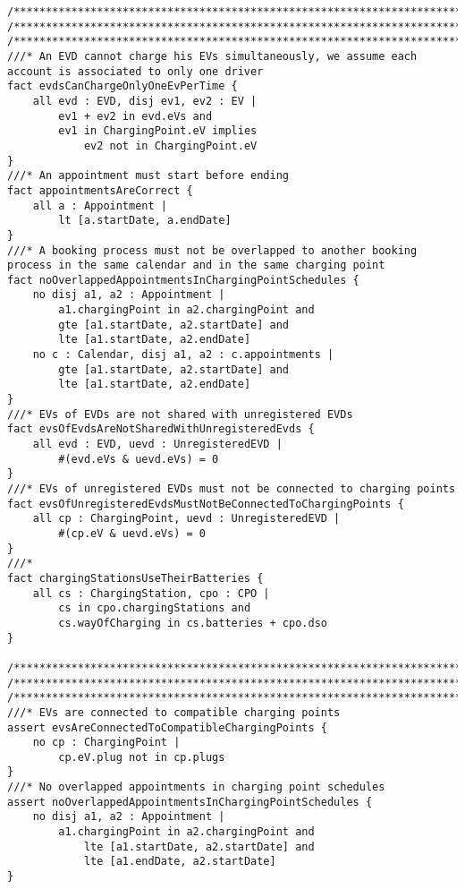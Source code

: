 \begin{lstlisting}[language=alloy]
/*****************************************************************************************************************/
/*****************************************************************************************************************/
/*****************************************************************************************************************/
///* An EVD cannot charge his EVs simultaneously, we assume each account is associated to only one driver
fact evdsCanChargeOnlyOneEvPerTime {
	all evd : EVD, disj ev1, ev2 : EV |
		ev1 + ev2 in evd.eVs and
		ev1 in ChargingPoint.eV implies
			ev2 not in ChargingPoint.eV
}
///* An appointment must start before ending
fact appointmentsAreCorrect {
	all a : Appointment |
		lt [a.startDate, a.endDate]
}
///* A booking process must not be overlapped to another booking process in the same calendar and in the same charging point
fact noOverlappedAppointmentsInChargingPointSchedules {
	no disj a1, a2 : Appointment |
		a1.chargingPoint in a2.chargingPoint and
		gte [a1.startDate, a2.startDate] and
		lte [a1.startDate, a2.endDate]
	no c : Calendar, disj a1, a2 : c.appointments |
		gte [a1.startDate, a2.startDate] and
		lte [a1.startDate, a2.endDate]
}
///* EVs of EVDs are not shared with unregistered EVDs
fact evsOfEvdsAreNotSharedWithUnregisteredEvds {
	all evd : EVD, uevd : UnregisteredEVD |
		#(evd.eVs & uevd.eVs) = 0
}
///* EVs of unregistered EVDs must not be connected to charging points
fact evsOfUnregisteredEvdsMustNotBeConnectedToChargingPoints {
	all cp : ChargingPoint, uevd : UnregisteredEVD |
		#(cp.eV & uevd.eVs) = 0
}
///*
fact chargingStationsUseTheirBatteries {
	all cs : ChargingStation, cpo : CPO |
		cs in cpo.chargingStations and
		cs.wayOfCharging in cs.batteries + cpo.dso
}

/*****************************************************************************************************************/
/*****************************************************************************************************************/
/*****************************************************************************************************************/
///* EVs are connected to compatible charging points
assert evsAreConnectedToCompatibleChargingPoints {
	no cp : ChargingPoint |
		cp.eV.plug not in cp.plugs
}
///* No overlapped appointments in charging point schedules
assert noOverlappedAppointmentsInChargingPointSchedules {
	no disj a1, a2 : Appointment |
		a1.chargingPoint in a2.chargingPoint and
			lte [a1.startDate, a2.startDate] and
			lte [a1.endDate, a2.startDate]
}


\end{lstlisting}
